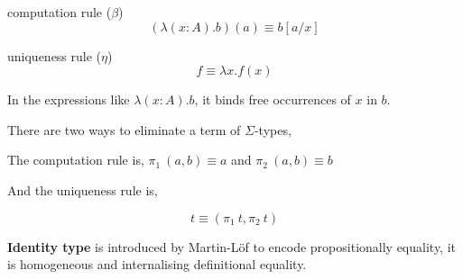 \begin{multicols}{2}
\columnbreak
{}
\end{multicols}



\begin{multicols}{2}
computation rule ($\beta$)
$$(\lambda (x:A).b)(a) \equiv b[a/x]$$

\columnbreak

uniqueness rule ($\eta$)
$$f \equiv \lambda x. f(x) $$
\end{multicols}

In the expressions like $\lambda (x:A).b$, it binds free occurrences of $x$ in $b$.




\begin{multicols}{2}
\columnbreak
{}
\end{multicols}

There are two ways to eliminate a term of $\Sigma$-types,


\begin{multicols}{2}
\columnbreak
{}
\end{multicols}

The computation rule is, $\pi_1 ~(a,b) \equiv a$ and $\pi_2 ~(a,b) \equiv b$

And the uniqueness rule is,

$$t \equiv (\pi_1 ~t, \pi_2 ~t)$$

\textbf{Identity type} is introduced by Martin-L\"{o}f \cite{nor:90} to encode propositionally equality, it is homogeneous and internalising definitional equality.


\begin{multicols}{2}
\columnbreak
{}
\end{multicols}

